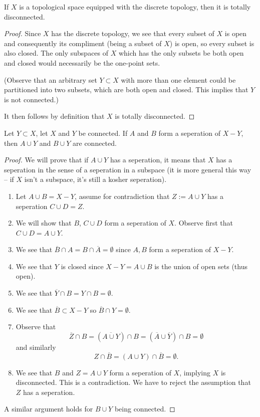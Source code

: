 \begin{thm}%
If $X$ is a topological space equipped with the discrete
topology, then it is totally disconnected.
\end{thm}
\begin{proof}
Since $X$ has the discrete topology, we see that every subset of
$X$ is open and consequently its compliment (being a subset of
$X$) is open, so every subset is also closed. The only subspaces
of $X$ which has the only subsets be both open and closed would
necessarily be the one-point sets. 

(Observe that an arbitrary set $Y\subset X$ with more than one
element could be partitioned into two subsets, which are both
open and closed. This implies that $Y$ is not connected.)

It then follows by definition that $X$ is totally disconnected.
\end{proof}
\begin{prop}%
Let $Y\subset X$, let $X$ and $Y$ be connected. If $A$ and $B$
form a seperation of $X-Y$, then $A\cup Y$ and $B\cup Y$ are
connected.
\end{prop}
\begin{proof} We will prove that if $A\cup Y$ has a seperation, it
  means that $X$ has a seperation in the sense of a seperation in
  a subspace (it is more general this way -- if $X$ isn't a
  subspace, it's still a kosher seperation).
\noindent\begin{enumerate}
\item Let $A\cup B=X-Y$, assume for contradiction that
  $Z:=A\cup Y$ has a seperation $C\cup D=Z$.
\item We will show that $B$, $C\cup D$ form a seperation of
  $X$. Observe first that $C\cup D=A\cup Y$.
\item We see that $\overline{B}\cap A=B\cap\overline{A}=\emptyset$ since $A,B$ form
  a seperation of $X-Y$.
\item We see that $Y$ is closed since $X-Y=A\cup B$ is the union
  of open sets (thus open).
\item We see that $\overline{Y}\cap B=Y\cap B=\emptyset$.
\item We see that $\overline{B}\subset X-Y$ so $\overline{B}\cap
  Y=\emptyset$.
\item Observe that 
\begin{equation}%
\overline{Z}\cap B=(\overline{A\cup Y})\cap B = (\overline{A}\cup\overline{Y})\cap B=\emptyset
\end{equation}
and similarly
\begin{equation}%
Z\cap\overline{B}=(A\cup Y)\cap\overline{B}=\emptyset.
\end{equation}
\item We see that $B$ and $Z=A\cup Y$ form a seperation of
  $X$, implying $X$ is disconnected. This is a contradiction. We
  have to reject the assumption that $Z$ has a seperation.
\end{enumerate}
A similar argument holds for $B\cup Y$ being connected.
\end{proof}
